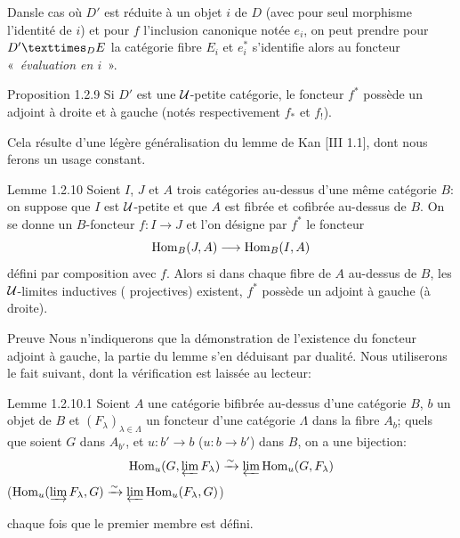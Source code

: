 \documentclass[10pt]{../fichiers-configuration-latex/smfart}
\begin{document}
Dans\pageoriginale le cas où $D'$ est réduite à un objet $i$ de $D$ (avec
pour seul morphisme l'identité de $i$) et pour $f$ l'inclusion canonique
notée $e_i$, on peut prendre pour $\fprod{D'}{E}{D}$ la catégorie fibre $E_i$
et $e^{\ast}_i$ s'identifie alors au foncteur
« \emph{évaluation en $i$} ».

\begin{enonce*}{Proposition 1.2.9}
Si $D'$ est une ${\mathcal U}$-petite catégorie, le foncteur $f^{\ast}$
possède un adjoint à droite et à gauche (notés respectivement
$f_{\ast}$ et $f_{!}$).
\end{enonce*}

Cela résulte d'une légère généralisation du lemme de Kan [III 1.1],
dont nous ferons un usage constant.

\begin{enonce*}{Lemme 1.2.10}
Soient $I$, $J$ et $A$ trois catégories au-dessus d'une même catégorie $B$:
on suppose que $I$ est ${\mathcal U}$-petite et que $A$ est fibrée et cofibrée
au-dessus de $B$. On se donne un $B$-foncteur $f : I \to J$ et l'on désigne
par $f^{\ast}$ le foncteur
$$
\operatorname{Hom}_B (J, A) \longrightarrow \operatorname{Hom}_B (I, A)
$$
défini par composition avec $f$. Alors si dans chaque fibre de $A$
au-dessus de $B$, les ${\mathcal U}$-limites inductives (\resp
projectives) existent, $f^{\ast}$ possède un adjoint à gauche (\resp à
droite).
\end{enonce*}

\begin{enonce*}[remark]{Preuve}
Nous n'indiquerons que la démonstration de l'existence du foncteur
adjoint à gauche, la partie \resp du lemme s'en déduisant par
dualité. Nous utiliserons le fait suivant, dont la vérification est
laissée au lecteur:
\end{enonce*}

\begin{enonce*}{Lemme 1.2.10.1}
Soient $A$ une catégorie bifibrée au-dessus d'une catégorie $B$, $b$
un objet de $B$ et $(F_{\lambda})_{\lambda \in \Lambda}$ un foncteur d'une
catégorie $\Lambda$ dans la fibre $A_b$; quels que soient $G$ dans $A_{b'}$,
et $u : b'\to b$ (\resp $u : b \to b'$) dans $B$, on a une bijection:
$$
\operatorname{Hom}_u(G, \varprojlim F_{\lambda}) \xrightarrow{\sim}
\varprojlim \operatorname{Hom}_u (G, F_{\lambda})
$$
(\resp $\operatorname{Hom}_u (\varinjlim F_{\lambda}, G)
\xrightarrow{\sim}\varprojlim \operatorname{Hom}_u (F_{\lambda}, G)$)

chaque fois que le premier membre est défini.
\end{enonce*}
\end{document}
